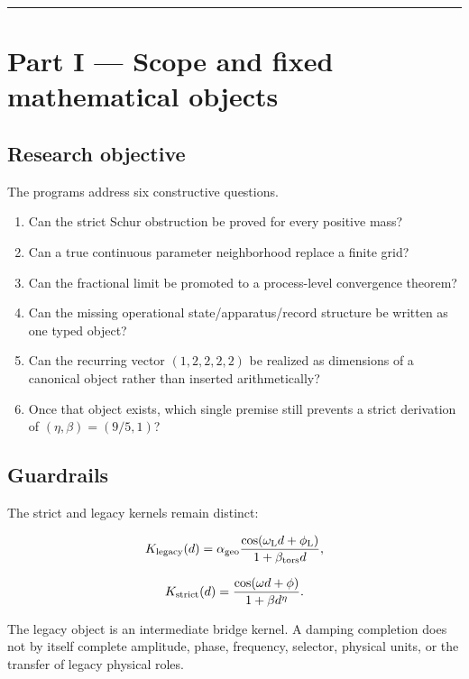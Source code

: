 \documentclass[11pt,a4paper,openany]{report}
\begin{document}
\par\medskip\hrule\medskip

\chapter{Part I --- Scope and fixed mathematical objects}

\section{Research objective}

The programs address six constructive questions.

\begin{enumerate}
\item 
Can the strict Schur obstruction be proved for every positive mass?

\item 
Can a true continuous parameter neighborhood replace a finite grid?

\item 
Can the fractional limit be promoted to a process-level convergence theorem?

\item 
Can the missing operational state/\allowbreak{}apparatus/\allowbreak{}record structure be written as one typed object?

\item 
Can the recurring vector \((1,2,2,2,2)\) be realized as dimensions of a canonical object rather than inserted arithmetically?

\item 
Once that object exists, which single premise still prevents a strict derivation of \((\eta,\beta)=(9/5,1)\)?

\end{enumerate}

\section{Guardrails}

The strict and legacy kernels remain distinct:

\[
K_{\rm legacy}(d)
=
\alpha_{\rm geo}
\frac{\cos(\omega_{\rm L}d+\phi_{\rm L})}
{1+\beta_{\rm tors}d},
\]

\[
K_{\rm strict}(d)
=
\frac{\cos(\omega d+\phi)}
{1+\beta d^\eta}.
\]

The legacy object is an intermediate bridge kernel. A damping completion does not by itself complete amplitude, phase, frequency, selector, physical units, or the transfer of legacy physical roles.
\end{document}
